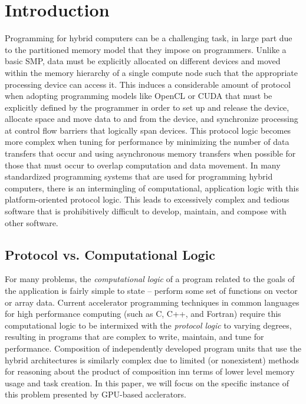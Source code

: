 
\section{Introduction}

Programming for hybrid computers can be a challenging task, in large
part due to the partitioned memory model that they impose on
programmers. Unlike a basic SMP, data must be explicitly allocated on
different devices and moved within the memory hierarchy of a single
compute node such that the appropriate processing device can access
it. This induces a considerable amount of protocol when adopting
programming models like OpenCL or CUDA that must be explicitly defined
by the programmer in order to set up and release the device, allocate
space and move data to and from the device, and synchronize processing
at control flow barriers that logically span devices. This protocol
logic becomes more complex when tuning for performance by minimizing
the number of data transfers that occur and using asynchronous memory
transfers when possible for those that must occur to overlap
computation and data movement.  In many standardized programming
systems that are used for programming hybrid computers, there is an
intermingling of computational, application logic with this
platform-oriented protocol logic.  This leads to excessively complex
and tedious software that is prohibitively difficult to develop,
maintain, and compose with other software.

\subsection{Protocol vs. Computational Logic}

For many problems, the \emph{computational logic} of a program related
to the goals of the application is fairly simple to state -- perform
some set of functions on vector or array data. Current accelerator
programming techniques in common languages for high performance
computing (such as C, C++, and Fortran) require this computational
logic to be intermixed with the \emph{protocol logic} to varying
degrees, resulting in programs that are complex to write, maintain,
and tune for performance.  Composition of independently developed
program units that use the hybrid architectures is similarly complex
due to limited (or nonexistent) methods for reasoning about the
product of composition inn terms of lower level memory usage and task
creation.  In this paper, we will focus on the specific instance of this
problem presented by GPU-based acclerators.

